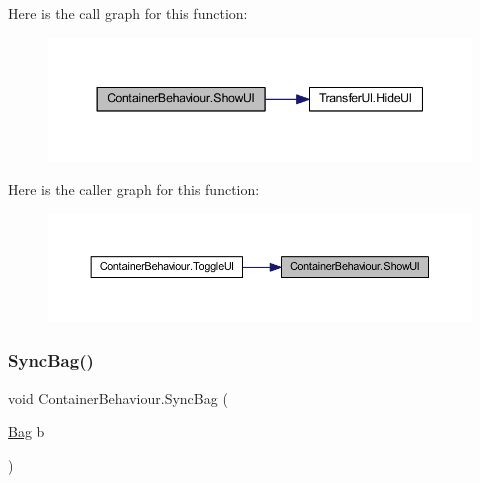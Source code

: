 Here is the call graph for this function\+:
\nopagebreak
\begin{figure}[H]
\begin{center}
\leavevmode
\includegraphics[width=344pt]{class_container_behaviour_ae4733d72cba5780939349f6d9beeba8f_cgraph}
\end{center}
\end{figure}
Here is the caller graph for this function\+:
\nopagebreak
\begin{figure}[H]
\begin{center}
\leavevmode
\includegraphics[width=350pt]{class_container_behaviour_ae4733d72cba5780939349f6d9beeba8f_icgraph}
\end{center}
\end{figure}
\mbox{\label{class_container_behaviour_aea3c37f67bc244516f307f2c59a27b8f}} 
\subsubsection{\texorpdfstring{SyncBag()}{SyncBag()}}
{\footnotesize\ttfamily void Container\+Behaviour.\+Sync\+Bag (\begin{DoxyParamCaption}\item[{\mbox{\hyperlink{class_bag}{Bag}}}]{b }\end{DoxyParamCaption})}

